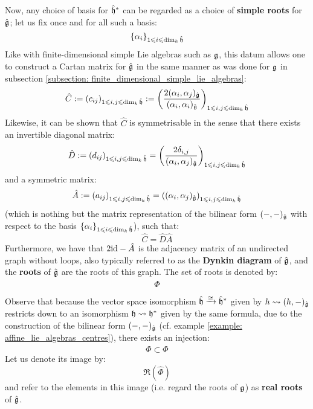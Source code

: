         Now, any choice of basis for $\hat{\mathfrak{h}}^*$ can be regarded as a choice of \textbf{simple roots} for $\hat{\mathfrak{g}}$; let us fix once and for all such a basis:
            $$\{\alpha_i\}_{1 \leqslant i \leqslant \dim_k \hat{\mathfrak{h}}}$$
        Like with finite-dimensional simple Lie algebras such as $\mathfrak{g}$, this datum allows one to construct a Cartan matrix for $\hat{\mathfrak{g}}$ in the same manner as was done for $\mathfrak{g}$ in subsection \ref{subsection: finite_dimensional_simple_lie_algebras}:
            $$\hat{C} := (c_{ij})_{1 \leqslant i, j \leqslant \dim_k \hat{\mathfrak{h}}} := \left( \frac{2(\alpha_i, \alpha_j)_{\hat{\mathfrak{g}}}}{(\alpha_i, \alpha_i)_{\hat{\mathfrak{g}}}} \right)_{1 \leqslant i, j \leqslant \dim_k \hat{\mathfrak{h}}}$$
        Likewise, it can be shown that $\hat{C}$ is symmetrisable in the sense that there exists an invertible diagonal matrix:
            $$\hat{D} := (d_{ij})_{1 \leqslant i, j \leqslant \dim_k \hat{\mathfrak{h}}} = \left(\frac{2\delta_{i, j}}{(\alpha_i, \alpha_j)_{\hat{\mathfrak{g}}}}\right)_{1 \leqslant i, j \leqslant \dim_k \hat{\mathfrak{h}}}$$
        and a symmetric matrix:
            $$\hat{A} := (a_{ij})_{1 \leqslant i, j \leqslant \dim_k \hat{\mathfrak{h}}} = \left((\alpha_i, \alpha_j)_{\hat{\mathfrak{g}}}\right)_{1 \leqslant i, j \leqslant \dim_k \hat{\mathfrak{h}}}$$
        (which is nothing but the matrix representation of the bilinear form $(-, -)_{\hat{\mathfrak{g}}}$ with respect to the basis $\{\alpha_i\}_{1 \leqslant i \leqslant \dim_k \hat{\mathfrak{h}}}$), such that:
            $$\hat{C} = \hat{D} \hat{A}$$
        Furthermore, we have that $2\mathrm{id} - \hat{A}$ is the adjacency matrix of an undirected graph without loops, also typically referred to as the \textbf{Dynkin diagram} of $\hat{\mathfrak{g}}$, and the \textbf{roots} of $\hat{\mathfrak{g}}$ are the roots of this graph. The set of roots is denoted by:
            $$\hat{\Phi}$$
            
        Observe that because the vector space isomorphism $\hat{\mathfrak{h}} \xrightarrow[]{\simeq} \hat{\mathfrak{h}}^*$ given by $h \leadsto (h, -)_{\hat{\mathfrak{g}}}$ restricts down to an isomorphism $\mathfrak{h} \leadsto \mathfrak{h}^*$ given by the same formula, due to the construction of the bilinear form $(-, -)_{\hat{\mathfrak{g}}}$ (cf. example \ref{example: affine_lie_algebras_centres}), there exists an injection:
            $$\Phi \subset \hat{\Phi}$$
        Let us denote its image by:
            $$\Re(\hat{\Phi})$$
        and refer to the elements in this image (i.e. regard the roots of $\mathfrak{g}$) as \textbf{real roots} of $\hat{\mathfrak{g}}$.
        
